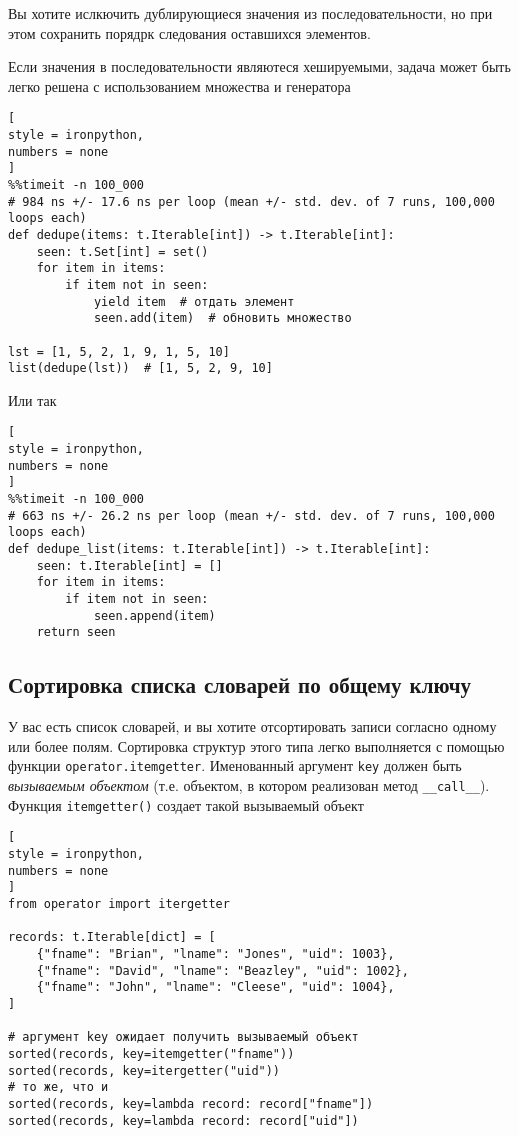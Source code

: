 \documentclass[%
	11pt,
	a4paper,
	utf8,
		]{article}
\begin{document}
Вы хотите ислкючить дублирующиеся значения из последовательности, но при этом сохранить порядрк следования оставшихся элементов.

Если значения в последовательности являютеся хешируемыми, задача может быть легко решена с использованием множества и генератора
\begin{lstlisting}[
style = ironpython,
numbers = none
]
%%timeit -n 100_000
# 984 ns +/- 17.6 ns per loop (mean +/- std. dev. of 7 runs, 100,000 loops each)
def dedupe(items: t.Iterable[int]) -> t.Iterable[int]:
    seen: t.Set[int] = set()
    for item in items:
        if item not in seen:
            yield item  # отдать элемент
            seen.add(item)  # обновить множество
            
lst = [1, 5, 2, 1, 9, 1, 5, 10]
list(dedupe(lst))  # [1, 5, 2, 9, 10]
\end{lstlisting}

Или так
\begin{lstlisting}[
style = ironpython,
numbers = none	
]
%%timeit -n 100_000
# 663 ns +/- 26.2 ns per loop (mean +/- std. dev. of 7 runs, 100,000 loops each)
def dedupe_list(items: t.Iterable[int]) -> t.Iterable[int]:
    seen: t.Iterable[int] = []
    for item in items:
        if item not in seen:
            seen.append(item)
    return seen
\end{lstlisting}

\subsection{Сортировка списка словарей по общему ключу}

У вас есть список словарей, и вы хотите отсортировать записи согласно одному или более полям. Сортировка структур этого типа легко выполняется с помощью функции \texttt{operator.itemgetter}. Именованный аргумент \texttt{key} должен быть \emph{вызываемым объектом} (т.е. объектом, в котором реализован метод \verb|__call__|). Функция \texttt{itemgetter()} создает такой вызываемый объект
\begin{lstlisting}[
style = ironpython,
numbers = none
]
from operator import itergetter

records: t.Iterable[dict] = [
    {"fname": "Brian", "lname": "Jones", "uid": 1003},
    {"fname": "David", "lname": "Beazley", "uid": 1002},
    {"fname": "John", "lname": "Cleese", "uid": 1004},
]

# аргумент key ожидает получить вызываемый объект
sorted(records, key=itemgetter("fname"))
sorted(records, key=itergetter("uid"))
# то же, что и
sorted(records, key=lambda record: record["fname"])
sorted(records, key=lambda record: record["uid"])
\end{lstlisting}
\end{document}
